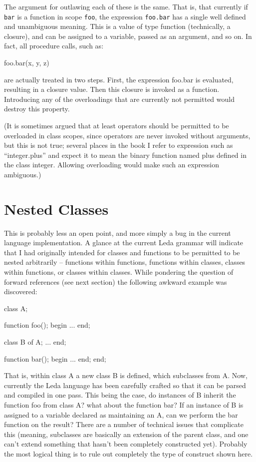 The argument for outlawing each of these is the same.  That is, that
currently if {\tt bar} is a function in scope {\tt foo}, the expression
{\tt foo.bar} has a single well defined and unambiguous meaning.
This is a value of type function (technically, a closure), and can
be assigned to a variable, passed as an argument, and so on.  In fact,
all procedure calls, such as:
\begin{cprog}

	foo.bar(x, y, z)

\end{cprog}\noindent
are actually treated in two steps.  First, the expression foo.bar is
evaluated, resulting in a closure value.  Then this closure is
invoked as a function.
Introducing any of the overloadings that are currently not permitted
would destroy this property.

(It is sometimes argued that at least operators should be permitted to
be overloaded in class scopes, since operators are never invoked without
arguments, but this is not true; several places in the book I refer
to expression such as ``integer.plus'' and expect it to mean the
binary function named plus defined in the class integer.  Allowing
overloading would make such an expression ambiguous.)

\section{Nested Classes}

This is probably less an open point, and more simply a bug in the
current language implementation.  A glance at the current Leda
grammar will indicate that I had originally intended for classes
and functions to be permitted to be nested arbitrarily -- functions
within functions, functions within classes, classes within functions,
or classes within classes.  While pondering the question of forward
references (see next section) the following awkward example was discovered: 

\begin{cprog}

class A;

	function foo();
	begin
		...
	end;

	class B of A;
	 ...
	end;

	function bar();
	begin
		...
	end;
end;

\end{cprog}

That is, within class A a new class B is defined, which subclasses from A.
Now, currently the Leda language has been carefully crafted so that it
can be parsed and compiled in one pass.  This being the case, do
instances of B inherit the function foo from class A?  what about
the function bar?  If an instance of B is assigned to a variable
declared as maintaining an A, can we perform the bar function on
the result?  There are a number of technical issues that complicate
this (meaning, subclasses are basically an extension of the parent
class, and one can't extend something that hasn't been completely
constructed yet).  Probably the most logical thing is to rule out
completely the type of construct shown here.

